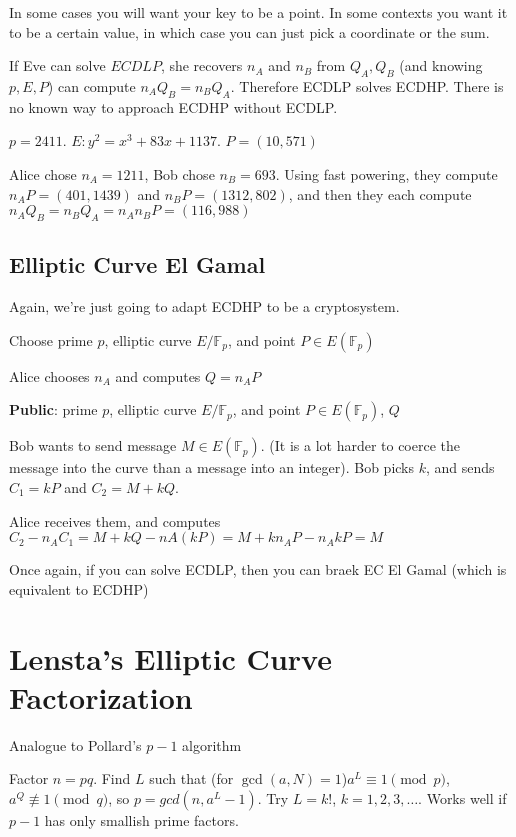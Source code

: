 \documentclass[10pt]{article}
\newcommand{\F}{\mathbb{F}}
\begin{document}
\begin{rmk}
    In some cases you will want your key to be a point. In some contexts you want it to be a certain value, in which case you can just pick a coordinate or the sum.
\end{rmk}

If Eve can solve $ECDLP$, she recovers $n_A$ and $n_B$ from $Q_A, Q_B$ (and knowing $p, E, P$) can compute $n_AQ_B = n_BQ_A$. Therefore ECDLP solves ECDHP. There is no known way to approach ECDHP without ECDLP.

\begin{exm*}
    $p = 2411$. $E: y^2 = x^3 + 83x + 1137$. $P = (10, 571)$
\end{exm*}

Alice chose $n_A = 1211$, Bob chose $n_B = 693$. Using fast powering, they compute $n_AP = (401, 1439)$ and $n_BP = (1312, 802)$, and then they each compute $n_AQ_B =  n_BQ_A = n_An_BP = (116, 988)$

\subsection{Elliptic Curve El Gamal} Again, we're just going to adapt ECDHP to be a cryptosystem.

Choose prime $p$, elliptic curve $E/\F_p$, and point $P \in E(\F_p)$

Alice chooses $n_A$ and computes $Q = n_A P$

\textbf{Public}: prime $p$, elliptic curve $E/\F_p$, and point $P \in E(\F_p)$, $Q$

Bob wants to send message $M \in E(\F_p)$. (It is a lot harder to coerce the message into the curve than a message into an integer). Bob picks $k$, and sends $C_1 = kP$ and $C_2 = M + kQ$.

Alice receives them, and computes $C_2 - n_AC_1 = M + kQ- nA(kP) = M + kn_AP - n_AkP = M$

Once again, if you can solve ECDLP, then you can braek EC El Gamal (which is equivalent to ECDHP)

\section{Lensta's Elliptic Curve Factorization}
Analogue to Pollard's $p-1$ algorithm

Factor $n = pq$. Find $L$ such that (for $\gcd(a, N) = 1$)$a^L \equiv 1 \pmod{p}$, $a^Q \not\equiv 1\pmod{q}$, so $p = gcd(n, a^L - 1)$.
Try $L = k!$, $k = 1, 2, 3, \ldots$. Works well if $p-1$ has only smallish prime factors.
\end{document}
